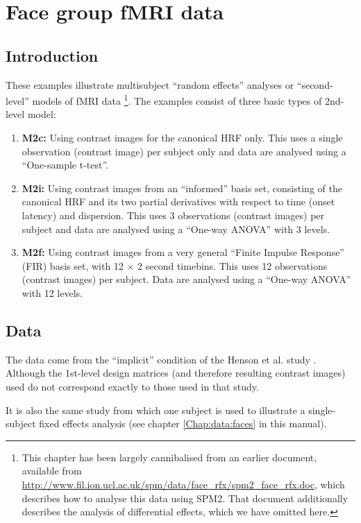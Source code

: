 \chapter{Face group fMRI data \label{Chap:data:faces_group}}

\section{Introduction}

These examples illustrate multisubject ``random effects'' analyses or ``second-level'' models of fMRI data \cite{will_hbf2_rfx}\footnote{This chapter has been largely cannibalised from an earlier document, available from \url{http://www.fil.ion.ucl.ac.uk/spm/data/face_rfx/spm2_face_rfx.doc}, which describes how to analyse this data using SPM2. That document additionally describes the analysis of differential effects, which we have omitted here.}.
The examples consist of three basic types of 2nd-level model:
\begin{enumerate}
\item \textbf{M2c:} Using contrast images for the canonical HRF only. This uses a single observation (contrast image) per subject only and data are analysed using a ``One-sample t-test''.
\item \textbf{M2i:} Using contrast images from an ``informed'' basis set, consisting of the canonical HRF and its two partial derivatives with respect to time (onset latency) and dispersion. This uses 3 observations (contrast images) per subject and data are analysed using a ``One-way ANOVA'' with 3 levels.
\item \textbf{M2f:} Using contrast images from a very general ``Finite Impulse Response'' (FIR) basis set, with 12 $\times$ 2 second timebins. This uses 12 observations (contrast images) per subject. Data are analysed using a ``One-way ANOVA'' with 12 levels.
\end{enumerate}

\section{Data}

The data come from the ``implicit'' condition of the Henson et al. study \cite{rnah_face_rep}. Although the 1st-level design matrices (and therefore resulting contrast images) used do not correspond exactly to those used in that study.

It is also the same study from which one subject is used to illustrate a single-subject fixed effects analysis (see chapter \ref{Chap:data:faces} in this manual).

